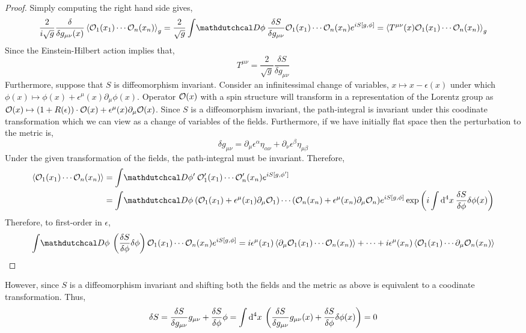 \documentclass[12pt]{extarticle}
\begin{document}
\begin{proof}
Simply computing the right hand side gives,
\[ \frac{2}{i \sqrt{g}} \frac{\delta}{\delta g_{\mu\nu}(x)} \EV{\Op_1(x_1) \cdots \Op_n(x_n)}_g = \frac{2}{\sqrt{g}} \int \pathd{\phi} \frac{\delta S}{\delta g_{\mu \nu}}  \Op_1(x_1) \cdots \Op_n(x_n) e^{i S[g, \phi]} = \EV{T^{\mu \nu}(x) \Op_1(x_1) \cdots \Op_n(x_n)}_g \]
Since the Einstein-Hilbert action implies that,
\[ T^{\mu \nu} = \frac{2}{\sqrt{g}} \frac{\delta S}{\delta g_{\mu \nu}} \]
Furthermore, suppose that $S$ is diffeomorphism invariant. Consider an infinitessimal change of variables, $x \mapsto x - \epsilon(x)$ under which $\phi(x) \mapsto \phi(x) + \epsilon^\mu(x) \partial_\mu \phi(x) $. Operator $\mathcal{O}(x)$ with a spin structure will transform in a representation of the Lorentz group as $\mathcal{O}(x) \mapsto (1 + R(\epsilon)) \cdot \mathcal{O}(x) + \epsilon^\mu(x) \partial_\mu \mathcal{O}(x)$. Since $S$ is a diffeomorphism invariant, the path-integral is invariant under this coodinate transformation which we can view as a change of variables of the fields. Furthermore, if we have initially flat space then the perturbation to the metric is,
\[ \delta g_{\mu \nu} = \partial_{\mu} \epsilon^{\alpha} \eta_{\alpha \nu} + \partial_\nu \epsilon^{\beta} \eta_{\mu \beta} \] 
Under the given transformation of the fields, the path-integral must be invariant. Therefore,
\begin{align*}
\EV{\Op_1(x_1) \cdots \Op_n(x_n)} & = \int \pathd{\phi'} \Op_1'(x_1) \cdots \Op_n'(x_n) e^{i S[g, \phi']} 
\\
& = \int \pathd{\phi} (\Op_1(x_1) + \epsilon^\mu(x_1) \partial_\mu \Op_1) \cdots (\Op_n(x_n) + \epsilon^\mu(x_n) \partial_\mu \Op_n) e^{i S[g, \phi]} \exp{\left( i \int \dn{4}{x} \frac{\delta S}{\delta \phi} \delta \phi(x) \right)}
\end{align*} 
Therefore, to first-order in $\epsilon$,
\[ \int \pathd{\phi} \left(  \frac{\delta S}{\delta \phi} \delta \phi \right) \Op_1(x_1) \cdots \Op_n(x_n) e^{i S[g, \phi]} = i \epsilon^\mu(x_1) \EV{\partial_\mu \Op_1(x_1) \cdots \Op_n(x_n)} + \cdots + i \epsilon^\mu(x_n) \EV{ \Op_1(x_1) \cdots \partial_\mu \Op_n(x_n)}\]
\end{proof}
However, since $S$ is a diffeomorphism invariant and shifting both the fields and the metric as above is equivalent to a coodinate transformation. Thus,
\[ \delta S = \frac{\delta S}{\delta g_{\mu \nu}} g_{\mu \nu} + \frac{\delta S}{\delta \phi} \phi = \int \mathrm{d}^{4} x \: \left( \frac{\delta S}{\delta g_{\mu \nu}} g_{\mu \nu}(x) + \frac{\delta S}{\delta \phi} \delta \phi(x) \right) = 0 \]
\end{document}
